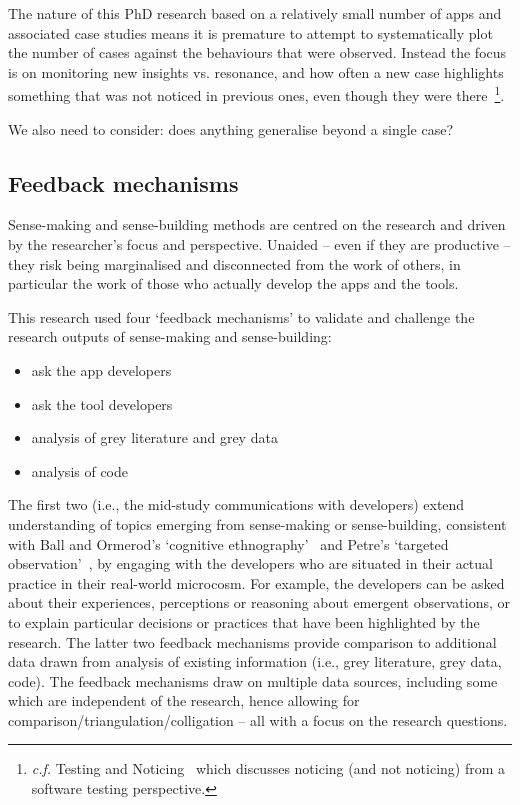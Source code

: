 The nature of this PhD research based on a relatively small number of apps and associated case studies means it is premature to attempt to systematically plot the number of cases against the behaviours that were observed. Instead the focus is on monitoring 
new insights vs. resonance, and how often a new case highlights something that was not noticed in previous ones, even though they were there~\footnote{\textit{c.f.} Testing and Noticing~\citep{bolton2009_testing_and_noticing} which discusses noticing (and not noticing) from a software testing perspective.}.

We also need to consider: does anything generalise beyond a single case?   


\subsection{Feedback mechanisms}
Sense-making and sense-building methods are centred on the research and driven by the researcher's focus and perspective. Unaided -- even if they are productive -- they risk being marginalised and disconnected from the work of others, in particular the work of those who actually develop the apps and the tools. 

This research used four `feedback mechanisms' to validate and challenge the research outputs of sense-making and sense-building:
\begin{itemize}
\itemsep0em
\item ask the app developers
\item ask the tool developers
\item analysis of grey literature and grey data
\item analysis of code
\end{itemize}
The first two (i.e., the mid-study communications with developers) extend understanding of topics emerging from sense-making or sense-building, consistent with Ball and Ormerod's `cognitive ethnography'~\citep{ball2000_putting_ethnography_to_work_cognitive_ethnography} and Petre's `targeted observation'~\citep[p.234]{petre2009_insights_from_expert_software_design_practice}, by engaging with the developers who are situated in their actual practice in their real-world microcosm.  For example, the developers can be asked about their experiences, perceptions or reasoning about emergent observations, or to explain particular decisions or practices that have been highlighted by the research. The latter two feedback mechanisms provide comparison to additional data drawn from analysis of existing information (i.e., grey literature, grey data, code).  The feedback mechanisms draw on multiple data sources, including some which are independent of the research, hence allowing for comparison/triangulation/colligation -- all with a focus on the research questions.


